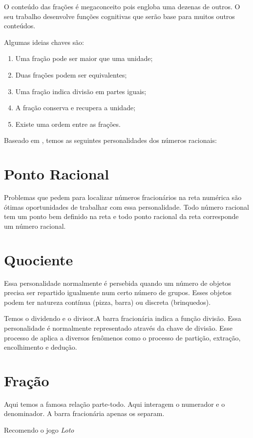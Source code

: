\begin{enumerate}
O conteúdo das frações é megaconceito pois engloba uma dezenas de outros. O seu trabalho desenvolve funções cognitivas que serão base para muitos outros conteúdos.

Algumas ideias chaves são:
\begin{enumerate}
    \item Uma fração pode ser maior que uma unidade;
    \item Duas frações podem ser equivalentes;
    \item Uma fração indica divisão em partes iguais;
    \item A fração conserva e recupera a unidade;
    \item Existe uma ordem entre as frações.
\end{enumerate}

Baseado em \cite{onuchic2008diferentes}, temos as seguintes personalidades dos números racionais:

\section{Ponto Racional}
Problemas que pedem para localizar números fracionários na reta numérica são ótimas oportunidades de trabalhar com essa personalidade. Todo número racional tem um ponto bem definido na reta e todo ponto racional da reta corresponde um número racional. 


\section{Quociente}
Essa personalidade normalmente é persebida quando um número de objetos precisa ser repartido igualmente num certo número de grupos. Esses objetos podem ter natureza contínua (pizza, barra) ou discreta (brinquedos).

Temos o dividendo e o divisor.A barra fracionária indica a função divisão. Essa personalidade é normalmente representado através da chave de divisão. Esse processo de aplica a diversos fenômenos como o processo de partição, extração, encolhimento e dedução.


\section{Fração}
Aqui temos a famosa relação parte-todo. Aqui interagem o numerador e o denominador. A barra fracionária apenas os separam.

Recomendo o jogo \textit{Loto }





\end{enumerate}
